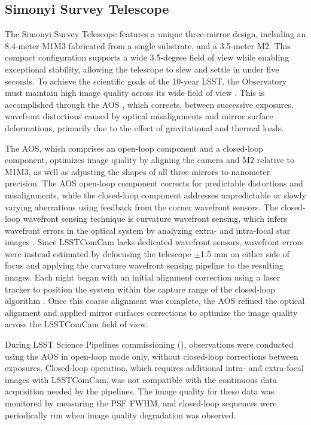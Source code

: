 \subsection{Simonyi Survey Telescope}
\label{ssec:simonyi}
The Simonyi Survey Telescope \citep{2024SPIE13094E..09S} features a unique three-mirror design, including an 8.4-meter \gls{M1M3} fabricated from a single substrate, and a 3.5-meter \gls{M2}.
This compact \gls{configuration} supports a wide 3.5-degree field of view while enabling exceptional stability, allowing the telescope to slew and settle in under five seconds.
To achieve the scientific goals of the 10-year \gls{LSST}, the Observatory must maintain high image quality across its wide field of view \citep{2008arXiv0805.2366I}.
This is accomplished through the \gls{AOS} \citep{2015ApOpt..54.9045X,MegiasHomar_2024}, which corrects, between successive exposures, wavefront distortions caused by optical misalignments and mirror surface deformations, primarily due to the effect of gravitational and thermal loads.

The \gls{AOS}, which comprises an open-loop component and a closed-loop component, optimizes image quality by aligning the camera and \gls{M2} relative to \gls{M1M3}, as well as adjusting the shapes of all three mirrors to nanometer precision.
The \gls{AOS} open-loop component corrects for predictable distortions and misalignments, while the closed-loop component addresses unpredictable or slowly varying aberrations using feedback from the corner wavefront sensors.
The closed-loop wavefront sensing technique is curvature wavefront sensing, which infers wavefront errors in the optical system by analyzing extra- and intra-focal star images \citep{2023aoel.confE..67T}.
Since \gls{LSSTComCam} lacks dedicated wavefront sensors, wavefront errors were instead estimated by defocusing the telescope $\pm$1.5 mm on either side of focus and applying the curvature wavefront sensing pipeline to the resulting images.
Each night began with an initial alignment correction using a laser tracker to position the system within the capture range of the closed-loop \gls{algorithm} \citep{10.1117/12.3019031}.
Once this coarse alignment was complete, the \gls{AOS} refined the optical alignment and applied mirror surfaces corrections to optimize the image quality across the \gls{LSSTComCam} field of view.

During LSST \gls{Science Pipelines} commissioning (),  observations were conducted using the AOS in open-loop mode only, without closed-loop corrections between exposures.
Closed-loop operation, which requires additional intra- and extra-focal images with \gls{LSSTComCam}, was not compatible with the continuous data acquisition needed by the pipelines.
The image quality for these data was monitored by measuring the \gls{PSF} \gls{FWHM}, and closed-loop sequences were periodically run when image quality degradation was observed.

